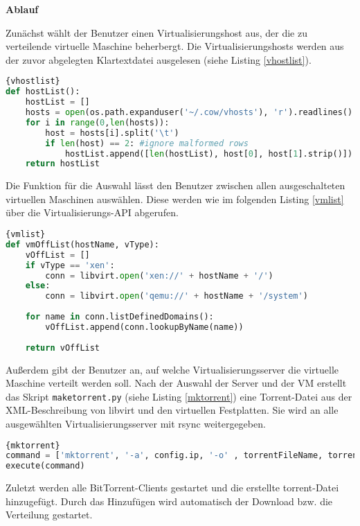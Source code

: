 \textbf{Ablauf}

Zunächst wählt der Benutzer einen Virtualisierungshost aus, der die zu verteilende virtuelle Maschine beherbergt. Die Virtualisierungshosts werden aus der zuvor abgelegten Klartextdatei ausgelesen (siehe Listing \ref{vhostlist}).
\\
\begin{lstlisting}[caption=Auslesen der registrierten Virtualisierungshosts,language=Python,label=vhostlist]{vhostlist}
def hostList():
	hostList = []
	hosts = open(os.path.expanduser('~/.cow/vhosts'), 'r').readlines()
	for i in range(0,len(hosts)):
		host = hosts[i].split('\t')
		if len(host) == 2: #ignore malformed rows
			hostList.append([len(hostList), host[0], host[1].strip()])
	return hostList
\end{lstlisting}

Die Funktion für die Auswahl lässt den Benutzer zwischen allen ausgeschalteten virtuellen Maschinen auswählen. Diese werden wie im folgenden Listing \ref{vmlist} über die Virtualisierungs-API abgerufen.
\\
\begin{lstlisting}[caption=Abruf der ausgeschalteten virtuellen Maschine mit libvirt,language=Python, label=vmlist]{vmlist}
def vmOffList(hostName, vType):
	vOffList = []
	if vType == 'xen':
		conn = libvirt.open('xen://' + hostName + '/')
	else:
		conn = libvirt.open('qemu://' + hostName + '/system')
	
	for name in conn.listDefinedDomains():
		vOffList.append(conn.lookupByName(name))
	
	return vOffList
\end{lstlisting}
Außerdem gibt der Benutzer an, auf welche Virtualisierungsserver die virtuelle Maschine verteilt werden soll. Nach der Auswahl der Server und der VM erstellt das Skript \lstinline|maketorrent.py| (siehe Listing \ref{mktorrent}) eine Torrent-Datei aus der XML-Beschreibung von libvirt und den virtuellen Festplatten. Sie wird an alle ausgewählten Virtualisierungsserver mit rsync weitergegeben. 
\\
\begin{lstlisting}[caption=Erstellen der Torrent-Datei,language=Python, label=mktorrent]{mktorrent}
command = ['mktorrent', '-a', config.ip, '-o' , torrentFileName, torrentDir]
execute(command)
\end{lstlisting}
Zuletzt werden alle BitTorrent-Clients gestartet und die erstellte torrent-Datei hinzugefügt. Durch das Hinzufügen wird automatisch der Download bzw. die Verteilung gestartet.

